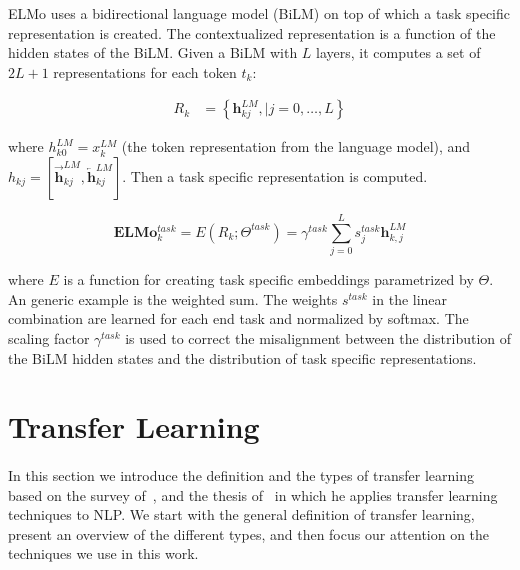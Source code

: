 ELMo uses a bidirectional language model (BiLM) on top of which a task specific representation is created. The contextualized representation is a function of the hidden states of the BiLM. Given a BiLM with $L$ layers, it computes a set of $2L+1$ representations for each token $t_k$:

\begin{equation}
\begin{split}
R_{k} & =\left\{\mathbf{h}_{kj}^{LM},| j=0, \ldots, L\right\}    
\end{split}
\end{equation}
 

where $h_{k0}^{LM} = x_k^{LM}$ (the token representation from the language model), and $h_{kj} = [\overrightarrow{\mathbf{h}}_{k j}^{LM}, \overleftarrow{\mathbf{h}}_{k j}^{L M}]$. Then a task specific representation is computed.

\begin{equation}
\mathbf{E} \mathbf{L} \mathbf{M} \mathbf{o}_{k}^{task}=E\left(R_{k} ; \Theta^{task}\right)=\gamma^{t a s k} \sum_{j=0}^{L} s_{j}^{task} \mathbf{h}_{k, j}^{LM}
\end{equation}

where  $E$ is a function for creating task specific embeddings parametrized by $\Theta$. An generic example is the weighted sum. The weights $s^{task}$ in the linear combination are learned for each end task and normalized by softmax. The scaling factor $\gamma^{task}$ is used to correct the misalignment between the distribution of the BiLM hidden states and the distribution of task specific representations.



\section{Transfer Learning}
\label{sec:transfer_learning}

\paragraph{}
In this section we introduce the definition and the types of transfer learning based on the survey of~\cite{pan2010transfer}, and the thesis of~\cite{ruder2019neural} in which he applies transfer learning techniques to NLP. We start with the general definition of transfer learning, present an overview of the different types, and then focus our attention on the techniques we use in this work. 


